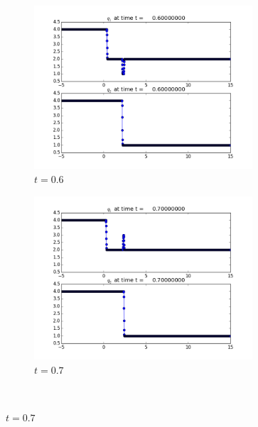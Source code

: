 \documentclass[11pt]{article}
\begin{document}
\begin{enumerate}
\begin{enumerate}
\begin{figure}[H]
						\centering
						\begin{subfigure}{.5\textwidth}
  							\centering
  							\includegraphics[width=1\linewidth,height=2.4in]{frame0006fig1.png}
  							\caption{$t=0.6$}
  							\label{fig:sub1}
						\end{subfigure}%
						\begin{subfigure}{.5\textwidth}
  							\centering
  							\includegraphics[width=1\linewidth,height=2.4in]{frame0007fig1.png}
  							\caption{$t=0.7$}
  							\label{fig:sub2}
						\end{subfigure}\\
					

\end{figure}
\end{enumerate}
\end{enumerate}
\end{document}
